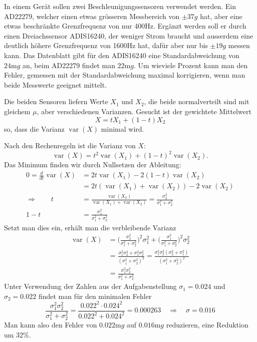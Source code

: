 In einem Gerät sollen zwei Beschleunigungssensoren verwendet
werden. Ein AD22279, welcher einen etwas grösseren Messbereich von
$\pm37g$ hat, aber eine etwas beschränkte Grenzfrequenz von nur 400Hz.
Ergänzt werden soll er durch einen Dreiachssensor ADIS16240,
der weniger Strom braucht und ausserdem eine deutlich höhere
Grenzfrequenz von 1600Hz hat, dafür aber nur bis $\pm19g$ messen kann.
Das Datenblatt gibt für den ADIS16240 eine Standardabweichung von
$24\text{m}g$ an, beim AD22279 findet man $22\text{m}g$.
Um wieviele Prozent kann man den Fehler, gemessen mit
der Standardabweichung maximal korrigieren, wenn man beide
Messwerte geeignet mittelt.


\begin{loesung}
Die beiden Sensoren liefern Werte $X_1$ und $X_2$, die
beide normalverteilt sind mit gleichem $\mu$, aber verschiedenen
Varianzen. Gesucht ist der gewichtete Mittelwert
\[
X=tX_1+(1-t)X_2
\]
so, dass die Varianz $\operatorname{var}(X)$ minimal wird.

Nach den Rechenregeln ist die Varianz von $X$:
\[
\operatorname{var}(X)=t^2\operatorname{var}(X_1)+(1-t)^2\operatorname{var}(X_2).
\]
Das Minimum finden wir durch Nullsetzen der Ableitung:
\begin{align*}
0=\frac{d}{dt}\operatorname{var}(X)
&=
2t\operatorname{var}(X_1)-2(1-t)\operatorname{var}(X_2)
\\
&=
2t(\operatorname{var}(X_1)+\operatorname{var}(X_2)) -2\operatorname{var}(X_2)
\\
\Rightarrow\qquad
t&=\frac{\operatorname{var}(X_2)}{\operatorname{var}(X_1)+\operatorname{var}(X_2)}
=\frac{\sigma_2^2}{\sigma_1^2+\sigma_2^2}
\\
1-t&=
\frac{\sigma_1^2}{\sigma_1^2+\sigma_2^2}
\end{align*}
Setzt man dies ein, erhält man die verbleibende Varianz
\begin{align*}
\operatorname{var}(X)
&=
\biggl(
\frac{\sigma_2^2}{\sigma_1^2+\sigma_2^2}
\biggr)^2
\sigma_1^2
+
\biggl(
\frac{\sigma_1^2}{\sigma_1^2+\sigma_2^2}
\biggr)^2
\sigma_2^2
\\
&=\frac{\sigma_1^2\sigma_2^4+\sigma_1^4\sigma_2^2}{(\sigma_1^2+\sigma_2^2)^2}
=\frac{\sigma_1^2\sigma_2^2(\sigma_2^2+\sigma_1^2)}{(\sigma_1^2+\sigma_2^2)^2}
\\
&=
\frac{\sigma_1^2\sigma_2^2}{\sigma_1^2+\sigma_2^2}
\end{align*}
Unter Verwendung der Zahlen aus der Aufgabenstellung
$\sigma_1=0.024$ und $\sigma_2=0.022$ findet man für
den minimalen Fehler
\[
\frac{\sigma_1^2\sigma_2^2}{\sigma_1^2+\sigma_2^2}=\frac{0.022^2\cdot 0.024^2}{0.022^2+0.024^2}=0.000263
\quad\Rightarrow\quad
\sigma
=0.016
\]
Man kann also den Fehler von $0.022\text{m}g$ auf
$0.016\text{m}g$ reduzieren, eine Reduktion um 32\%.
\end{loesung}

